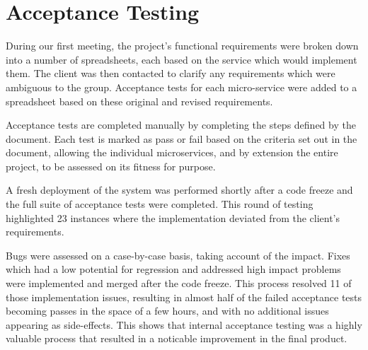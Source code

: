 \section{Acceptance Testing}
\par
During our first meeting, the project's functional requirements were broken down into a number of spreadsheets, each based on the service which would implement them. The client was then contacted to clarify any requirements which were ambiguous to the group. Acceptance tests for each micro-service were added to a spreadsheet based on these original and revised requirements.

\par
Acceptance tests are completed manually by completing the steps defined by the document. Each test is marked as pass or fail based on the criteria set out in the document, allowing the individual microservices, and by extension the entire project, to be assessed on its fitness for purpose.

\par
A fresh deployment of the system was performed shortly after a code freeze and the full suite of acceptance tests were completed. This round of testing highlighted 23 instances where the implementation deviated from the client's requirements.

\par
Bugs were assessed on a case-by-case basis, taking account of the impact. Fixes which had a low potential for regression and addressed high impact problems were implemented and merged after the code freeze. This process resolved 11 of those implementation issues, resulting in almost half of the failed acceptance tests becoming passes in the space of a few hours, and with no additional issues appearing as side-effects. This shows that internal acceptance testing was a highly valuable process that resulted in a noticable improvement in the final product.
